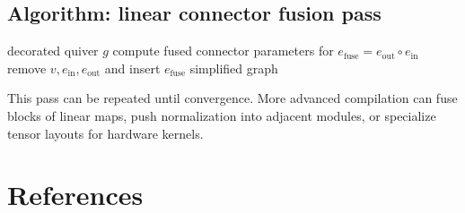 \documentclass[11pt]{article}
\theoremstyle{definition}
\theoremstyle{plain}
\theoremstyle{remark}
\begin{document}
\subsection{Algorithm: linear connector fusion pass}
\begin{algorithm}[t]
\caption{Fuse consecutive linear connectors (local compilation pass)}
\label{alg:fuse}
\begin{algorithmic}[1]
\Require decorated quiver $g$
    \State compute fused connector parameters for $e_\mathrm{fuse}=e_\mathrm{out}\circ e_\mathrm{in}$
    \State remove $v,e_\mathrm{in},e_\mathrm{out}$ and insert $e_\mathrm{fuse}$
  \EndIf
\EndFor
\State \Return simplified graph
\end{algorithmic}
\end{algorithm}

This pass can be repeated until convergence.
More advanced compilation can fuse blocks of linear maps, push normalization into adjacent modules, or specialize tensor layouts for hardware kernels.

\section{References}
\label{sec:refs}
\end{document}
